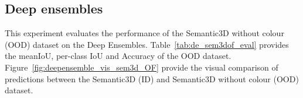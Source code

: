     \subsection{Deep ensembles}
    This experiment evaluates the performance of the Semantic3D without colour (OOD) dataset on the Deep Ensembles.
    Table~\ref{tab:de_sem3dof_eval} provides the meanIoU, per-class IoU and Accuracy of the OOD dataset.
    Figure~\ref{fig:deepensemble_vis_sem3d_OF} provide the visual comparison of predictions between the Semantic3D (ID) and Semantic3D without colour (OOD) dataset.

